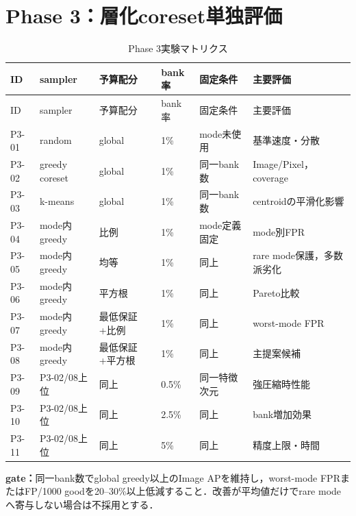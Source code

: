 \documentclass[a4paper,11pt]{ltjsarticle}
\begin{document}
\section{Phase 3：層化coreset単独評価}
\begin{landscape}
\begin{longtable}{L{18mm}L{40mm}L{35mm}L{40mm}L{45mm}L{45mm}}
\caption{Phase 3実験マトリクス}\\
\toprule
ID & sampler & 予算配分 & bank率 & 固定条件 & 主要評価 \\
\midrule
\endfirsthead
\toprule
ID & sampler & 予算配分 & bank率 & 固定条件 & 主要評価 \\
\midrule
\endhead
P3-01 & random & global & 1\% & mode未使用 & 基準速度・分散 \\
P3-02 & greedy coreset & global & 1\% & 同一bank数 & Image/Pixel，coverage \\
P3-03 & k-means & global & 1\% & 同一bank数 & centroidの平滑化影響 \\
P3-04 & mode内greedy & 比例 & 1\% & mode定義固定 & mode別FPR \\
P3-05 & mode内greedy & 均等 & 1\% & 同上 & rare mode保護，多数派劣化 \\
P3-06 & mode内greedy & 平方根 & 1\% & 同上 & Pareto比較 \\
P3-07 & mode内greedy & 最低保証+比例 & 1\% & 同上 & worst-mode FPR \\
P3-08 & mode内greedy & 最低保証+平方根 & 1\% & 同上 & 主提案候補 \\
P3-09 & P3-02/08上位 & 同上 & 0.5\% & 同一特徴次元 & 強圧縮時性能 \\
P3-10 & P3-02/08上位 & 同上 & 2.5\% & 同上 & bank増加効果 \\
P3-11 & P3-02/08上位 & 同上 & 5\% & 同上 & 精度上限・時間 \\
\bottomrule
\end{longtable}
\end{landscape}
\textbf{gate：}同一bank数でglobal greedy以上のImage APを維持し，worst-mode FPRまたはFP/1000 goodを20--30\%以上低減すること．改善が平均値だけでrare modeへ寄与しない場合は不採用とする．
\end{document}
